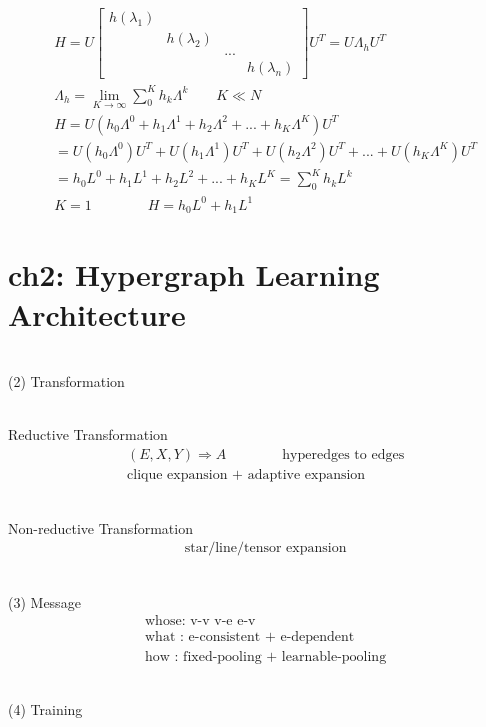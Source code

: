 \documentclass{article}
\begin{document}
\begin{align*}
    & H = 
        U
        \begin{bmatrix}
            h \left ( \lambda_{1} \right ) &  &  & \\
            &  h \left ( \lambda_{2} \right ) &  & \\
            &  &  ... & \\
            &  &  & h \left ( \lambda_{n} \right )
        \end{bmatrix}
        U^{T}
        = 
        U \Lambda_{h} U^{T}  \\[3pt]
    & \Lambda_{h} = 
        \lim_{K \to \infty} \sum_{0}^{K} h_{k} \Lambda^{k} \qquad K \ll N  \\[3pt]
    & H = U
    \left (
    h_{0} \Lambda^{0} +
    h_{1} \Lambda^{1} +
    h_{2} \Lambda^{2} +
    ... +
    h_{K} \Lambda^{K}
    \right )
    U^{T}  \\[3pt]
    &= 
    U \left ( h_{0} \Lambda^{0} \right ) U^{T} +
    U \left ( h_{1} \Lambda^{1} \right ) U^{T} +
    U \left ( h_{2} \Lambda^{2} \right ) U^{T} +
    ... +
    U \left ( h_{K} \Lambda^{K} \right ) U^{T} \\[3pt]
    &=
    h_{0} L^{0} +
    h_{1} L^{1} +
    h_{2} L^{2} +
    ... +
    h_{K} L^{K}
    = 
    \sum_{0}^{K} h_{k} L^{k} \\[3pt]
    & K = 1 \qquad \qquad
    H = 
h_{0} L^{0} +
h_{1} L^{1}
\end{align*}
\newpage
\section*{ch2: Hypergraph Learning Architecture}





~ \\[3pt]
(2) Transformation

~ \\[3pt]
Reductive Transformation
\begin{align*}
    & ( E, X, Y ) \Rightarrow A 
    \qquad \qquad 
    \text{hyperedges to edges} \\[3pt]
    & \text{clique expansion + adaptive expansion}
\end{align*}

~ \\[3pt]
Non-reductive Transformation
\begin{align*}
    & \text{star/line/tensor expansion}
\end{align*}


~ \\[3pt]
(3) Message
\begin{align*}
    & \text{whose: v-v \ v-e \ e-v} \\[3pt]
    & \text{what : e-consistent + e-dependent} \\[3pt]
    & \text{how  : fixed-pooling + learnable-pooling} 
\end{align*}


~ \\[3pt]
(4) Training
\end{document}
